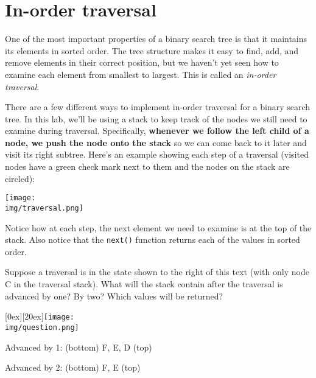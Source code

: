 \section*{In-order traversal}

One of the most important properties of a binary search tree is that
it maintains its elements in sorted order. The tree structure makes it
easy to find, add, and remove elements in their correct position, but
we haven't yet seen how to examine each element from smallest
to largest. This is called an \emph{in-order traversal}.

There are a few different ways to implement in-order traversal for a
binary search tree. In this lab, we'll be using a stack to keep track
of the nodes we still need to examine during traversal.  Specifically,
\textbf{whenever we follow the left child of a node, we push the node
  onto the stack} so we can come back to it later and visit its right
subtree. Here's an example showing each step of a traversal (visited
nodes have a green check mark next to them and the nodes on the stack
are circled):

\centerline{\texttt{[image: \\img/traversal.png]}}

Notice how at each step, the next element we need to examine is at the
top of the stack. Also notice that the \lstinline'next()' function returns
each of the values in sorted order.

\begin{part}
\begin{minipage}[t]{0.65\linewidth}
  Suppose a traversal is in the state shown to the right of this text
  (with only node C in the traversal stack). What will the stack
  contain after the traversal is advanced by one? By two? Which values
  will be returned?
\end{minipage}
\begin{minipage}[t]{0.3\linewidth}
  \rule{0em}{0ex}%
  \hfill
  \raisebox{-20ex}[0ex][20ex]{\texttt{[image: \\img/question.png]}}
\end{minipage}

\end{part}
\vspace*{-2em}
\onePT[-8ex]
\begin{solution}
Advanced by 1:  (bottom) F, E, D (top)

Advanced by 2:  (bottom) F, E (top)
\end{solution}
